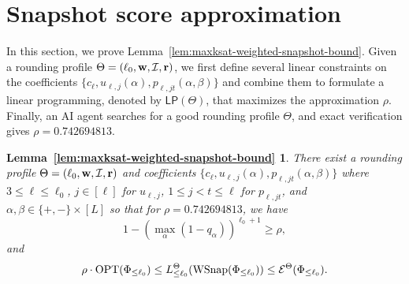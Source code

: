 \section{Snapshot score approximation}
\label{sec:Snapshot_score_approximation}
In this section, we prove Lemma~\ref{lem:maxksat-weighted-snapshot-bound}. Given a rounding profile $\Theta= (\ell_0,\mathbf{w},\mathcal{I},\mathbf{r})$, 
we first define several linear constraints on the coefficients $\{c_{\ell }, u_{\ell,j}(\alpha), p_{\ell,jt}(\alpha,\beta)\}$ and combine them to formulate a linear programming, denoted by $\mathsf{LP}(\Theta)$,  that  maximizes the approximation $\rho$.
Finally, an AI agent searches for a good  rounding profile $\Theta$, and exact verification gives $\rho=0.742694813$.


\theoremstyle{plain}
\newtheorem*{restatedsnapshotbound}{Lemma~\ref{lem:maxksat-weighted-snapshot-bound}}
\theoremstyle{definition}

\begin{restatedsnapshotbound}
There exist  a rounding profile $\Theta= (\ell_0,\mathbf{w},\mathcal{I},\mathbf{r})$ and coefficients $ \{c_{\ell
 }, u_{\ell,j}(\alpha), p_{\ell,jt}(\alpha,\beta) \}$ where $3\le \ell\le \ell_0$, $j\in[\ell]$ for $u_{\ell,j}$, $1\le j<t\le\ell$ for $p_{\ell,jt}$, and $\alpha,\beta\in \{+,-\}\times [L]$ so that  for $\rho = 0.742694813$,  we have
  \[
  1-\left(\max_{\alpha}(1-q_\alpha)\right)^{\ell_0+1}\ge\rho,
 \]
 and
 \[
 \rho\cdot \operatorname{OPT}(\Phi_{\le \ell_0})\le  L_{\le\ell_0}^\Theta(\operatorname{WSnap}(\Phi_{\le\ell_0})) \le \mathcal{E}^{\Theta}(\Phi_{\le\ell_0}).
 \]
\end{restatedsnapshotbound}

